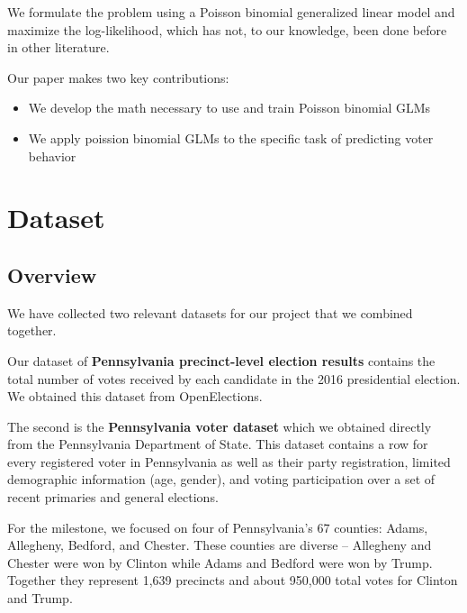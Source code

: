 \documentclass[10pt, letterpaper]{article}
\begin{document}
We formulate the problem using a Poisson binomial generalized linear model and maximize the log-likelihood, which has not, to our knowledge, been done before in other literature.

Our paper makes two key contributions:
\begin{itemize}[noitemsep]
	\item We develop the math necessary to use and train Poisson binomial GLMs
	\item We apply poission binomial GLMs to the specific task of predicting voter behavior
\end{itemize}

\section{Dataset}

\subsection{Overview}

We have collected two relevant datasets for our project that we combined together.

Our dataset of \textbf{Pennsylvania precinct-level election results} contains the total number of votes received by each candidate in the 2016 presidential election. We obtained this dataset from OpenElections\cite{OpenElections}.

The second is the \textbf{Pennsylvania voter dataset} which we obtained directly from the Pennsylvania Department of State\cite{PAVoterFile}. This dataset contains a row for every registered voter in Pennsylvania as well as their party registration, limited demographic information (age, gender), and voting participation over a set of recent primaries and general elections.

For the milestone, we focused on four of Pennsylvania's 67 counties: Adams, Allegheny, Bedford, and Chester. These counties are diverse -- Allegheny and Chester were won by Clinton while Adams and Bedford were won by Trump. Together they represent 1,639 precincts and about 950,000 total votes for Clinton and Trump. 
\end{document}
